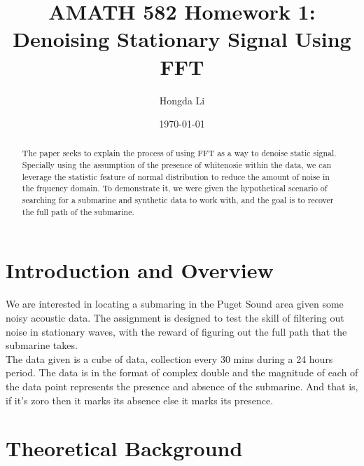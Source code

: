\documentclass{article}
\title{AMATH 582 Homework 1: Denoising Stationary Signal Using FFT}
\author{Hongda Li}
\date{\today}
\begin{document}
\maketitle

\begin{abstract}
    The paper seeks to explain the process of using FFT as a way to denoise static signal. Specially using the assumption of the presence of whitenosie within the data, we can leverage the statistic feature of normal distribution to reduce the amount of noise in the frquency domain. To demonstrate it, we were given the hypothetical scenario of searching for a submarine and synthetic data to work with, and the goal is to recover the full path of the submarine. 
\end{abstract}

\section{Introduction and Overview}
We are interested in locating a submaring in the Puget Sound area given some noisy acoustic data. The assignment is designed to test the skill of filtering out noise in stationary waves, with the reward of figuring out the full path that the submarine takes. 
\\
The data given is a cube of data, collection every 30 mins during a 24 hours period. The data is in the format of complex double and the magnitude of each of the data point represents the presence and absence of the submarine. And that is, if it's zoro then it marks its absence else it marks its presence. 



\section{Theoretical Background}
\end{document}
